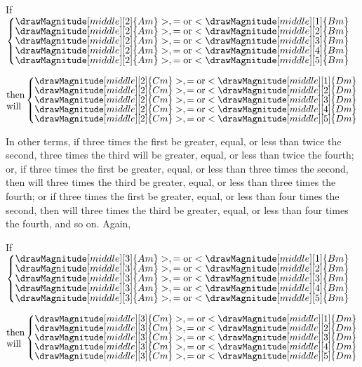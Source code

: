 \documentclass[booklanguage=english]{byrnebook}
\begin{document}
\begin{center}
If
$\left\{\vcenter{
\nointerlineskip\hbox{$\drawMagnitude[middle][2]{Am} >, = \mbox{or} < \drawMagnitude[middle][1]{Bm}$}
\nointerlineskip\hbox{$\drawMagnitude[middle][2]{Am} >, = \mbox{or} < \drawMagnitude[middle][2]{Bm}$}
\nointerlineskip\hbox{$\drawMagnitude[middle][2]{Am} >, = \mbox{or} < \drawMagnitude[middle][3]{Bm}$}
\nointerlineskip\hbox{$\drawMagnitude[middle][2]{Am} >, = \mbox{or} < \drawMagnitude[middle][4]{Bm}$}
\nointerlineskip\hbox{$\drawMagnitude[middle][2]{Am} >, = \mbox{or} < \drawMagnitude[middle][5]{Bm}$}
}\right.$

$\vcenter{\hbox{then}\hbox{will}}\left\{\vcenter{
\nointerlineskip\hbox{$\drawMagnitude[middle][2]{Cm} >, = \mbox{or} < \drawMagnitude[middle][1]{Dm}$}
\nointerlineskip\hbox{$\drawMagnitude[middle][2]{Cm} >, = \mbox{or} < \drawMagnitude[middle][2]{Dm}$}
\nointerlineskip\hbox{$\drawMagnitude[middle][2]{Cm} >, = \mbox{or} < \drawMagnitude[middle][3]{Dm}$}
\nointerlineskip\hbox{$\drawMagnitude[middle][2]{Cm} >, = \mbox{or} < \drawMagnitude[middle][4]{Dm}$}
\nointerlineskip\hbox{$\drawMagnitude[middle][2]{Cm} >, = \mbox{or} < \drawMagnitude[middle][5]{Dm}$}
}\right.$
\end{center}

In other terms, if three times the first be greater, equal, or less than twice the second, three times the third will be greater, equal, or less than twice the fourth; or, if three times the first be greater, equal, or less than three times the second, then will three times the third be greater, equal, or less than three times the fourth; or if three times the first be greater, equal, or less than four times the second, then will three times the third be greater, equal, or less than four times the fourth, and so on. Again,

\begin{center}
If
$\left\{\vcenter{
\nointerlineskip\hbox{$\drawMagnitude[middle][3]{Am} >, = \mbox{or} < \drawMagnitude[middle][1]{Bm}$}
\nointerlineskip\hbox{$\drawMagnitude[middle][3]{Am} >, = \mbox{or} < \drawMagnitude[middle][2]{Bm}$}
\nointerlineskip\hbox{$\drawMagnitude[middle][3]{Am} >, = \mbox{or} < \drawMagnitude[middle][3]{Bm}$}
\nointerlineskip\hbox{$\drawMagnitude[middle][3]{Am} >, = \mbox{or} < \drawMagnitude[middle][4]{Bm}$}
\nointerlineskip\hbox{$\drawMagnitude[middle][3]{Am} >, = \mbox{or} < \drawMagnitude[middle][5]{Bm}$}
}\right.$

$\vcenter{\hbox{then}\hbox{will}}\left\{\vcenter{
\nointerlineskip\hbox{$\drawMagnitude[middle][3]{Cm} >, = \mbox{or} < \drawMagnitude[middle][1]{Dm}$}
\nointerlineskip\hbox{$\drawMagnitude[middle][3]{Cm} >, = \mbox{or} < \drawMagnitude[middle][2]{Dm}$}
\nointerlineskip\hbox{$\drawMagnitude[middle][3]{Cm} >, = \mbox{or} < \drawMagnitude[middle][3]{Dm}$}
\nointerlineskip\hbox{$\drawMagnitude[middle][3]{Cm} >, = \mbox{or} < \drawMagnitude[middle][4]{Dm}$}
\nointerlineskip\hbox{$\drawMagnitude[middle][3]{Cm} >, = \mbox{or} < \drawMagnitude[middle][5]{Dm}$}
}\right.$
\end{center}
\end{document}
